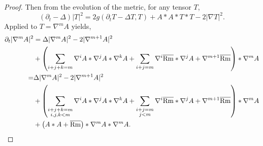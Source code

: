 \documentclass{amsart}
\begin{document}
\begin{proof}
Then from the evolution of the metric, for any tensor \(T\),
\[
(\partial_t - \Delta) |T|^2 = 2g(\partial_t T - \Delta T, T)  + A \ast A \ast T \ast T - 2 |\nabla T|^2.
\]
Applied to \(T = \nabla^m A\) yields,
\begin{equation}
\label{eq:higher_derivatives_evolution}
\begin{split}
\partial_t |\nabla^m A|^2 &= \Delta |\nabla^m A|^2 - 2 |\nabla^{m+1} A|^2 \\
&+ \left(\sum_{i+j+k=m} \nabla^i A \ast \nabla^j A \ast \nabla^k A + \sum_{i+j=m} \nabla^i \overline{\operatorname{Rm}} \ast \nabla^j A + \nabla^{m+1} \overline{\operatorname{Rm}}\right) \ast \nabla^m A \\
=& \Delta |\nabla^m A|^2 - 2 |\nabla^{m+1} A|^2 \\
&+ \left(\sum_{\substack{i+j+k=m \\ i,j,k<m}} \nabla^i A \ast \nabla^j A \ast \nabla^k A + \sum_{\substack{i+j=m \\ j<m}} \nabla^i \overline{\operatorname{Rm}} \ast \nabla^j A + \nabla^{m+1} \overline{\operatorname{Rm}}\right) \ast \nabla^m A \\
&+ \left(A \ast A + \overline{\operatorname{Rm}}\right) \ast \nabla^m A \ast \nabla^m A.
\end{split}
\end{equation}


\end{proof}
\end{document}
